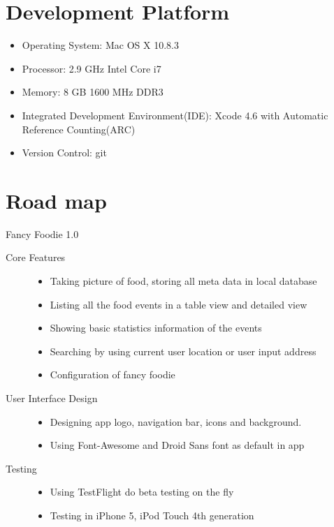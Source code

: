 \section{Development Platform} %
\label{sec:development_platform}
\begin{itemize}
\item Operating System: Mac OS X 10.8.3 
\item Processor: 2.9 GHz Intel Core i7
\item Memory:  8 GB 1600 MHz DDR3
\item Integrated Development Environment(IDE): Xcode 4.6 with Automatic Reference Counting(ARC)
\item Version Control: git
\end{itemize}

\section{Road map} %
\label{sec:roadmap}
Fancy Foodie 1.0
\begin{description}
	\item[Core Features] \hfill 
		\begin{itemize}
		    \item Taking picture of food, storing all meta data in local database 
		    \item Listing all the food events in a table view and detailed view
			\item Showing basic statistics information of the events
			\item Searching by using current user location or user input address
			\item Configuration of fancy foodie
		 \end{itemize}
	\item[User Interface Design] \hfill 
		\begin{itemize}
		    \item Designing app logo, navigation bar, icons and background.  
		    \item Using Font-Awesome and Droid Sans font as default in app
		 \end{itemize}
	 \item[Testing] \hfill 
		\begin{itemize}
		    \item Using TestFlight do beta testing on the fly 
		    \item Testing in iPhone 5, iPod Touch 4th generation
		 \end{itemize}
\end{description}



